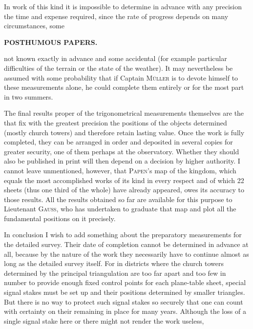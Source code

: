 \par\noindent\hspace*{\parindent}In work of this kind it is impossible to determine in advance with any precision the time and expense required, since the rate of progress depends on many circumstances, some

\par\clearpage
\noindent{}\hfill{\small\textbf{POSTHUMOUS PAPERS.}}\hfill\null\par\medskip

\noindent not known exactly in advance and some accidental (for example particular difficulties of the terrain or the state of the weather). It may nevertheless be assumed with some probability that if Captain \textsc{Müller} is to devote himself to these measurements alone, he could complete them entirely or for the most part in two summers.

\par\medskip
\par\noindent\hspace*{\parindent}The final results proper of the trigonometrical measurements themselves are the  that fix with the greatest precision the positions of the objects determined (mostly church towers) and therefore retain lasting value. Once the work is fully completed, they can be arranged in order and deposited in several copies for greater security, one of them perhaps at the observatory. Whether they should also be published in print will then depend on a decision by higher authority. I cannot leave unmentioned, however, that \textsc{Papen}'s map of the kingdom, which equals the most accomplished works of its kind in every respect and of which 22 sheets (thus one third of the whole) have already appeared, owes its accuracy to those results. All the results obtained so far are available for this purpose to Lieutenant \textsc{Gauss}, who has undertaken to graduate that map and plot all the fundamental positions on it precisely.

\par\medskip
\par\noindent\hspace*{\parindent}In conclusion I wish to add something about the preparatory measurements for the detailed survey. Their date of completion cannot be determined in advance at all, because by the nature of the work they necessarily have to continue almost as long as the detailed survey itself. For in districts where the church towers determined by the principal triangulation are too far apart and too few in number to provide enough fixed control points for each plane-table sheet, special signal stakes must be set up and their positions determined by smaller triangles. But there is no way to protect such signal stakes so securely that one can count with certainty on their remaining in place for many years. Although the loss of a single signal stake here or there might not render the work useless,

